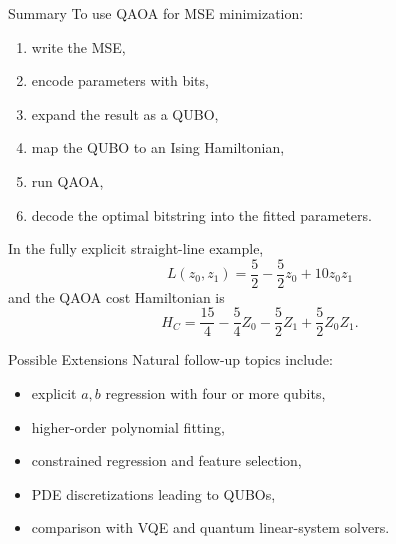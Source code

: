 \documentclass{beamer}
\begin{document}
\begin{frame}{Summary}
To use QAOA for MSE minimization:
\begin{enumerate}
\item write the MSE,
\item encode parameters with bits,
\item expand the result as a QUBO,
\item map the QUBO to an Ising Hamiltonian,
\item run QAOA,
\item decode the optimal bitstring into the fitted parameters.
\end{enumerate}

In the fully explicit straight-line example,
\[
L(z_0,z_1)=\frac52 - \frac52 z_0 + 10 z_0 z_1
\]
and the QAOA cost Hamiltonian is
\[
H_C
=
\frac{15}{4}
-\frac{5}{4} Z_0
-\frac{5}{2} Z_1
+\frac{5}{2} Z_0 Z_1.
\]
\end{frame}

\begin{frame}{Possible Extensions}
Natural follow-up topics include:
\begin{itemize}
\item explicit \(a,b\) regression with four or more qubits,
\item higher-order polynomial fitting,
\item constrained regression and feature selection,
\item PDE discretizations leading to QUBOs,
\item comparison with VQE and quantum linear-system solvers.
\end{itemize}
\end{frame}
\end{document}
